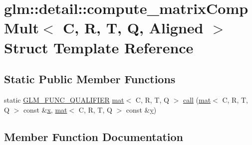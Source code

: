 \hypertarget{structglm_1_1detail_1_1compute__matrix_comp_mult}{}\section{glm\+:\+:detail\+:\+:compute\+\_\+matrix\+Comp\+Mult$<$ C, R, T, Q, Aligned $>$ Struct Template Reference}
\label{structglm_1_1detail_1_1compute__matrix_comp_mult}
\subsection*{Static Public Member Functions}
\begin{DoxyCompactItemize}
\item 
static \mbox{\hyperlink{setup_8hpp_a33fdea6f91c5f834105f7415e2a64407}{G\+L\+M\+\_\+\+F\+U\+N\+C\+\_\+\+Q\+U\+A\+L\+I\+F\+I\+ER}} \mbox{\hyperlink{structglm_1_1mat}{mat}}$<$ C, R, T, Q $>$ \mbox{\hyperlink{structglm_1_1detail_1_1compute__matrix_comp_mult_a9c27721a9eb38a6ec56d5b321c384b9a}{call}} (\mbox{\hyperlink{structglm_1_1mat}{mat}}$<$ C, R, T, Q $>$ const \&\mbox{\hyperlink{_s_d_l__opengl_8h_ad0e63d0edcdbd3d79554076bf309fd47}{x}}, \mbox{\hyperlink{structglm_1_1mat}{mat}}$<$ C, R, T, Q $>$ const \&\mbox{\hyperlink{_s_d_l__opengl_8h_a1675d9d7bb68e1657ff028643b4037e3}{y}})
\end{DoxyCompactItemize}


\subsection{Member Function Documentation}
\mbox{\label{structglm_1_1detail_1_1compute__matrix_comp_mult_a9c27721a9eb38a6ec56d5b321c384b9a}} 
